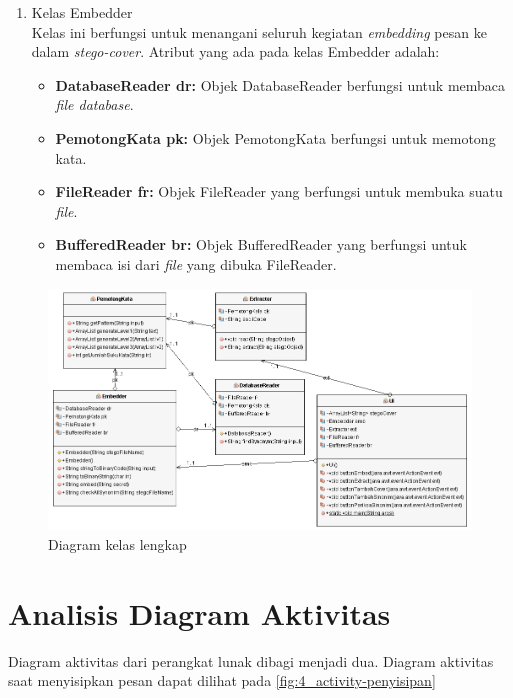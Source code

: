 \begin{enumerate}
	\item Kelas Embedder\\
	Kelas ini berfungsi untuk menangani seluruh kegiatan \textit{embedding} pesan ke dalam \textit{stego-cover}. Atribut yang ada pada kelas Embedder adalah:
	\begin{itemize}
		\item \textbf{DatabaseReader dr:} Objek DatabaseReader berfungsi untuk membaca \textit{file database}.
		\item \textbf{PemotongKata pk:} Objek PemotongKata berfungsi untuk memotong kata.
		\item \textbf{FileReader fr:} Objek FileReader yang berfungsi untuk membuka suatu \textit{file}.
		\item \textbf{BufferedReader br:} Objek BufferedReader yang berfungsi untuk membaca isi dari \textit{file} yang dibuka FileReader.
	\end{itemize}
\end{enumerate}

\begin{figure}[H]
	\centering
	\includegraphics[scale=0.6]{Gambar/class-diagram-lengkap}
	\caption{Diagram kelas lengkap} 
	\label{fig:6-class-diagram-lengkap}
\end{figure}

\section{Analisis Diagram Aktivitas}

Diagram aktivitas dari perangkat lunak dibagi menjadi dua. Diagram aktivitas saat menyisipkan pesan dapat dilihat pada \ref{fig:4_activity-penyisipan}

